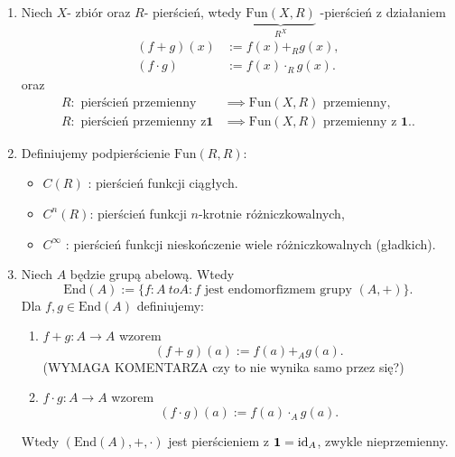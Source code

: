 \begin{enumerate}[label=\arabic*)]
	Wtedy $\left( M_{n}\left( \mathbb{R}  \right)  \right) $ to pierścień z $\mathbf{1}$, tzn.
	\[
		\mathbf{1} = \mathcal{I} = \begin{pmatrix} \mathbf{1}_{R} & \ldots & 0 \\ \vdots & \ddots & \vdots \\ 0 & \ldots & \mathbf{1}_{R} \end{pmatrix} 
	.\] 
	Czyli przykładowo mamy pierścień $M_3\left( \mathbb{Z}_{3} \right) $.
	\item Niech $X$- zbiór oraz $R$- pierścień, wtedy $\underbrace{\text{Fun}\left( X,R \right)}_{R^{X}}$ -pierścień z działaniem 
		\begin{align*}
			\left( f + g \right) \left( x \right) &:= f\left( x \right) +_{R} g\left( x \right), \\
			\left( f \cdot g \right) &:= f\left( x \right) \cdot_{R} g\left( x \right) 
		.\end{align*}
		oraz
		\begin{align*}
			R: \text{ pierścień przemienny } &\implies \text{Fun}\left( X,R \right) \text{ przemienny},\\
			R: \text{ pierścień przemienny z} \mathbf{1} &\implies \text{Fun}\left( X,R \right) \text{ przemienny z } \mathbf{1}.
		.\end{align*}
	\item Definiujemy podpierścienie $\text{Fun}\left( R, R \right)$:
		\begin{itemize}
			\item $C\left( R \right) $ : pierścień funkcji ciągłych.
			\item $C^{n}\left( R \right)$: pierścień funkcji $n$-krotnie różniczkowalnych,
			\item $C^{\infty}$ : pierścień funkcji nieskończenie wiele różniczkowalnych (gładkich).
		\end{itemize}
	\item Niech $A$ będzie grupą abelową. Wtedy
		\[
		\text{End}\left( A \right) := \{f: A\ to A: f \text{ jest endomorfizmem grupy }\left( A,+ \right) \}
		.\] 
		Dla $f,g \in \text{End}\left( A \right) $ definiujemy:
		\begin{enumerate}[label=\roman*)]
			\item $f+g: A \to A$ wzorem
				\[
					\left( f+g \right) \left( a \right) := f\left( a \right) +_{A} g\left( a \right) 
				.\]
			(WYMAGA KOMENTARZA czy to nie wynika samo przez się?)
		        \item $f\cdot g: A \to A$ wzorem
				\[
					\left( f\cdot g \right)\left( a \right) := f\left( a \right) \cdot_{A} g\left( a \right) 
				.\] 
		\end{enumerate}
		Wtedy $\left( \text{End}\left( A \right), +, \cdot  \right) $ jest pierścieniem z $\mathbf{1}=\operatorname{id}_{A}$, zwykle nieprzemienny.
\end{enumerate}
